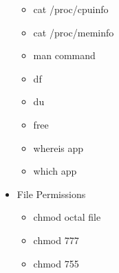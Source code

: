 \documentclass{article}
\begin{document}
\begin{itemize}
\begin{itemize}
				\item cat /proc/cpuinfo
				\item cat /proc/meminfo
				\item man command
				\item df
				\item du
				\item free
				\item whereis app
				\item which app
			\end{itemize}
		\item File Permissions
			\begin{itemize}
				\item chmod octal file
				\item chmod 777
				\item chmod 755
			\end{itemize}
	\end{itemize}
\end{document}
